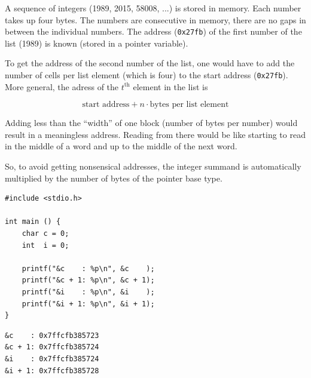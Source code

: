 {{{{\begin{defbox}
\begin{center}
\end{center}

A sequence of integers (1989, 2015, 58008, ...) is stored in memory. Each number takes up four bytes. The numbers are consecutive in memory, \ie there are no gaps in between the individual numbers. The address (\texttt{0x27fb}) of the first number of the list (1989) is known (\eg stored in a pointer variable).

To get the address of the second number of the list, one would have to add the number of cells per list element (which is four) to the start address (\texttt{0x27fb}). More general, the adress of the $t^{\text{th}}$ element in the list is

\[ \text{start address} + n \cdot \textrm{bytes per list element} \]
\end{defbox}

Adding less than the \enquote{width} of one block (\ie number of bytes per number) would result in a meaningless address. Reading from there would be like starting to read in the middle of a word and up to the middle of the next word.

So, to avoid getting nonsensical addresses, the integer summand is automatically multiplied by the number of bytes of the pointer base type.

\begin{tcbraster}[raster columns=2,
                  raster equal height,
                  nobeforeafter,
                  raster column skip=0.2cm]
\begin{codebox}[pointerArithmetic.c]
\begin{verbatim}
#include <stdio.h>

int main () {
    char c = 0;
    int  i = 0;

    printf("&c    : %p\n", &c    );
    printf("&c + 1: %p\n", &c + 1);
    printf("&i    : %p\n", &i    );
    printf("&i + 1: %p\n", &i + 1);
}
\end{verbatim}
 \label{code:ptrArithmetic}
\end{codebox}
%
\begin{cmdbox}
\begin{verbatim}
&c    : 0x7ffcfb385723
&c + 1: 0x7ffcfb385724
&i    : 0x7ffcfb385724
&i + 1: 0x7ffcfb385728
\end{verbatim}
\end{cmdbox}
\end{tcbraster}

}}}}
